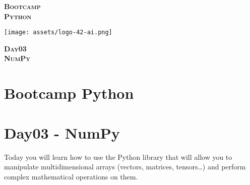 \documentclass[]{article}
\date{}
\begin{document}

\vspace*{2cm}
\begin{center}
    \textsc{\fontsize{40}{48} \bfseries Bootcamp}\\[0.6cm]
    \textsc{\fontsize{39}{48} \bfseries { %
Python
    }}\\[0.3cm]
\end{center}
\vspace{3cm}

\begin{center}
\texttt{[image: assets/logo-42-ai.png]}{\centering}
\end{center}

\vspace*{2cm}
\begin{center}
    \textsc{\fontsize{32}{48} \bfseries %
Day03    
    }\\[0.6cm]
    \textsc{\fontsize{32}{48} \bfseries %
NumPy    
    }\\[0.3cm]
\end{center}
\vspace{3cm}

\newpage

\setcounter{page}{1}



\hypertarget{bootcamp-python}{%
\section{Bootcamp Python}\label{bootcamp-python}}

\hypertarget{day03---numpy}{%
\section{Day03 - NumPy}\label{day03---numpy}}

Today you will learn how to use the Python library that will allow you
to manipulate multidimensional arrays (vectors, matrices,
tensors\ldots{}) and perform complex mathematical operations on them.
\end{document}
